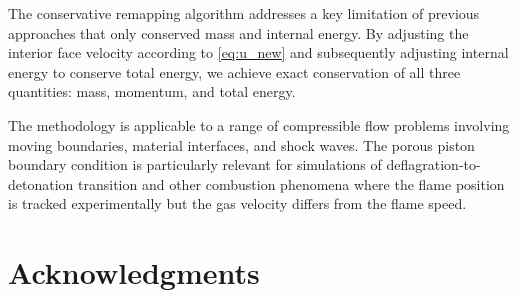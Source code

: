 \documentclass[12pt,a4paper]{article}
\begin{document}
The conservative remapping algorithm addresses a key limitation of previous approaches that only conserved mass and internal energy. By adjusting the interior face velocity according to \eqref{eq:u_new} and subsequently adjusting internal energy to conserve total energy, we achieve exact conservation of all three quantities: mass, momentum, and total energy.

The methodology is applicable to a range of compressible flow problems involving moving boundaries, material interfaces, and shock waves. The porous piston boundary condition is particularly relevant for simulations of deflagration-to-detonation transition and other combustion phenomena where the flame position is tracked experimentally but the gas velocity differs from the flame speed.

\section*{Acknowledgments}

\end{document}
